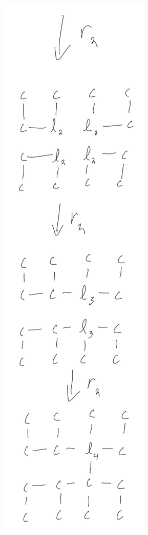 \documentclass[]{article}
\numberwithin{equation}{section}
\begin{document}
\begin{multicols}{3}
    \includegraphics[width=\columnwidth]{figs/pblm6_4b.png}
\end{multicols}
\end{document}
